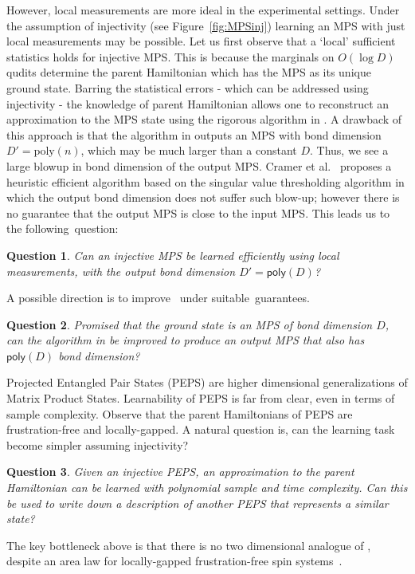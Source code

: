 \documentclass[11pt]{article}
\newcommand{\poly}{\ensuremath{\mathsf{poly}}}
\newtheorem{question}{Question}
\begin{document}
However, local measurements are more ideal in the experimental settings. Under the assumption of injectivity (see Figure~\ref{fig:MPSinj}) learning an \textsf{MPS} with just local measurements may be possible. Let us first observe that a `local' sufficient statistics holds for injective \textsf{MPS}. This is because the marginals on $O(\log D)$ qudits determine the parent Hamiltonian which has the \textsf{MPS} as its unique ground state. Barring the statistical errors - which can be addressed using injectivity - the knowledge of parent Hamiltonian allows one to reconstruct an approximation to the \textsf{MPS} state using the rigorous algorithm in \cite{LandauVV15, AradLVV17}. A drawback of this approach is that the algorithm in \cite{LandauVV15, AradLVV17} outputs an \textsf{MPS} with bond dimension $D'=\text{poly}(n)$, which may be much larger than a constant $D$.  Thus, we see a large blowup in bond dimension of the output MPS.   Cramer et al.~\cite{CPFSGBLPL10} proposes a heuristic efficient algorithm based on the singular value thresholding algorithm in which the output bond dimension does not suffer such blow-up; however there is no guarantee that the output \textsf{MPS} is  close to the input MPS. This leads us to the following~question:
\begin{question}
    Can an injective \textsf{MPS} be learned efficiently using local measurements, with the output bond dimension $D'=\poly(D)$? 
\end{question}
A possible direction is to improve~\cite{LandauVV15,AradLVV17} under suitable~guarantees.
\begin{question}
 Promised that the ground state is an \textsf{MPS} of bond dimension $D$, can the algorithm in \cite{LandauVV15,AradLVV17} be improved to produce an output \textsf{MPS} that also has $\poly(D)$ bond dimension? 
\end{question}
Projected Entangled Pair States (\textsf{PEPS}) are higher dimensional generalizations of Matrix Product States. Learnability of \textsf{PEPS} is far from clear, even in terms of sample complexity. Observe that the parent Hamiltonians of \textsf{PEPS} are frustration-free and locally-gapped. A natural question is, can the learning task become simpler assuming injectivity?
\begin{question}
    Given an injective \textsf{PEPS}, an approximation to the parent Hamiltonian can be learned with polynomial sample and time complexity. Can this be used to write down a description of another \textsf{PEPS} that represents a similar state? 
\end{question}
The key bottleneck above is that there is no two dimensional analogue of \cite{LandauVV15}, despite an area law for locally-gapped frustration-free spin systems~\cite{AAG22}. 
\end{document}
